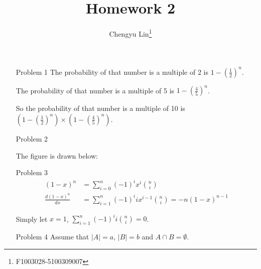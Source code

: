 \documentclass{article}
\title{Homework 2}
\author{Chengyu Lin\footnote{F1003028-5100309007}}
\date{}
\begin{document}
\maketitle

\begin{itemize}
    \item[Problem 1]
        The probability of that number is a multiple of 2 is
        $1 - (\frac{1}{2})^n$.

        The probability of that number is a multiple of 5 is
        $1 - (\frac{4}{5})^n$.

        So the probability of that number is a multiple of 10 is
        $(1-(\frac{1}{2})^n) \times (1-(\frac{4}{5})^n)$.


    \item[Problem 2]

        The figure is drawn below:


    \item[Problem 3]
        \begin{align*}
            (1-x)^n &= \sum_{i=0}^{n} (-1)^i x^i {n \choose i} \\
            \frac{d (1-x)^n}{dx} &=
            \sum_{i=1}^{n} (-1)^i i x^{i-1} {n \choose i}
            = -n(1-x)^{n-1}
        \end{align*}

        Simply let $x = 1$, $\sum_{i=1}^{n} (-1)^i i {n \choose i} = 0$.

    \item[Problem 4]
        Assume that $|A| = a$, $|B| = b$ and $A \cap B = \emptyset$.


\end{itemize}
\end{document}
